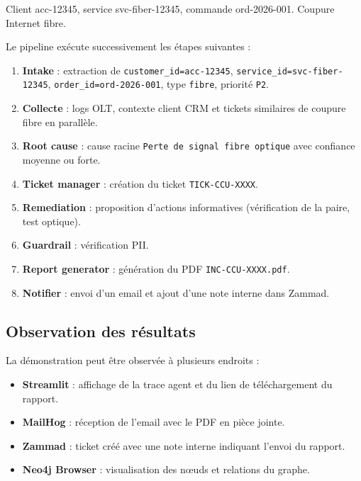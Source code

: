 \begin{fquote}
Client acc-12345, service svc-fiber-12345, commande ord-2026-001. Coupure Internet fibre.
\end{fquote}

Le pipeline exécute successivement les étapes suivantes :

\begin{enumerate}
    \item \textbf{Intake} : extraction de \texttt{customer\_id=acc-12345}, \texttt{service\_id=svc-fiber-12345}, \texttt{order\_id=ord-2026-001}, type \texttt{fibre}, priorité \texttt{P2}.
    \item \textbf{Collecte} : logs OLT, contexte client CRM et tickets similaires de coupure fibre en parallèle.
    \item \textbf{Root cause} : cause racine \texttt{Perte de signal fibre optique} avec confiance moyenne ou forte.
    \item \textbf{Ticket manager} : création du ticket \texttt{TICK-CCU-XXXX}.
    \item \textbf{Remediation} : proposition d'actions informatives (vérification de la paire, test optique).
    \item \textbf{Guardrail} : vérification PII.
    \item \textbf{Report generator} : génération du PDF \texttt{INC-CCU-XXXX.pdf}.
    \item \textbf{Notifier} : envoi d'un email et ajout d'une note interne dans Zammad.
\end{enumerate}

\subsection{Observation des résultats}
La démonstration peut être observée à plusieurs endroits :

\begin{itemize}
    \setlength\itemsep{0.1em}
    \setlength\parskip{0pt}
    \setlength\parsep{0pt}
    \item \textbf{Streamlit} : affichage de la trace agent et du lien de téléchargement du rapport.
    \item \textbf{MailHog} : réception de l'email avec le PDF en pièce jointe.
    \item \textbf{Zammad} : ticket créé avec une note interne indiquant l'envoi du rapport.
    \item \textbf{Neo4j Browser} : visualisation des nœuds et relations du graphe.
\end{itemize}

